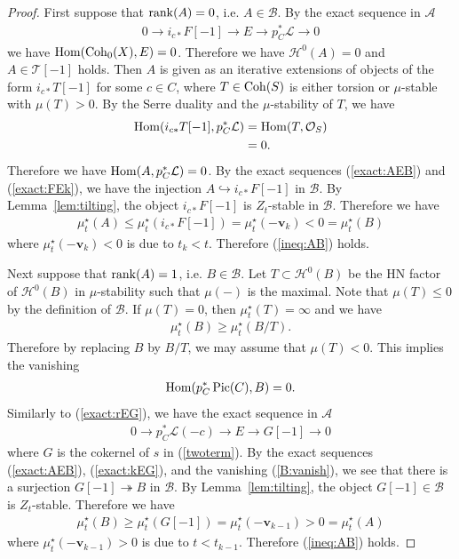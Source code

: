 \documentclass[11pt]{amsart}
\theoremstyle{plain}
\newcommand{\aA}{\mathcal{A}}
\newcommand{\bB}{\mathcal{B}}
\newcommand{\hH}{\mathcal{H}}
\newcommand{\lL}{\mathcal{L}}
\newcommand{\oO}{\mathcal{O}}
\newcommand{\tT}{\mathcal{T}}
\newcommand{\Hom}{\mathop{\rm Hom}\nolimits}
\newcommand{\Pic}{\mathop{\rm Pic}\nolimits}
\newcommand{\rank}{\mathop{\rm rank}\nolimits}
\newcommand{\Coh}{\mathop{\rm Coh}\nolimits}
\begin{document}
\begin{proof}
First suppose that 
$\rank(A)=0$, i.e. $A \in \bB$. 
By the exact sequence in $\aA$
\begin{align}\label{exact:FEk}
0 \to i_{c\ast}F[-1] \to E \to p_C^{\ast}\lL \to 0
\end{align}
we have
$\Hom(\Coh_0(X), E)=0$. 
Therefore we have $\hH^0(A)=0$
and $A \in \tT[-1]$ holds. 
Then $A$ is given as an iterative extensions
of objects of the form $i_{c\ast}T[-1]$ 
for some $c \in C$, 
where $T \in \Coh(S)$ is either torsion or 
$\mu$-stable with $\mu(T)>0$. 
By the Serre duality and the $\mu$-stability of $T$, we have 
\begin{align*}
\Hom(i_{c\ast}T[-1], p^{\ast}_C\lL) &=
\Hom(T, \oO_{S}) \\
&=0. 
\end{align*}
Therefore we have $\Hom(A, p^{\ast}_C\lL)=0$. 
By the exact sequences (\ref{exact:AEB}) and (\ref{exact:FEk}), 
we have the injection 
$A \hookrightarrow i_{c\ast}F[-1]$ in $\bB$. By Lemma~\ref{lem:tilting}, 
the object $i_{c\ast}F[-1]$ is $Z_t$-stable
in $\bB$. Therefore we have
\begin{align*}
\mu_t^{\star}(A) \le \mu_t^{\star}(i_{c\ast}F[-1])
=\mu_t^{\star}(-\mathbf{v}_k)<0=\mu_t^{\star}(B)
\end{align*}
where $\mu_t^{\star}(-\mathbf{v}_k)<0$ is due to $t_k<t$. 
Therefore (\ref{ineq:AB}) holds. 

Next suppose that $\rank(A)=1$, i.e. $B \in \bB$. 
Let $T \subset \hH^0(B)$ be
the HN factor of $\hH^0(B)$ in $\mu$-stability 
such that
$\mu(-)$ is the maximal. 
Note that $\mu(T) \le 0$ 
by the definition of $\bB$. 
If $\mu(T)=0$, then 
$\mu_t^{\star}(T)=\infty$ and we have 
\begin{align*}
\mu_t^{\star}(B) \ge \mu_t^{\star}(B/T).
\end{align*}
Therefore by replacing $B$ by $B/T$, we may assume that 
$\mu(T)<0$. 
This implies the vanishing 
\begin{align}\label{B:vanish}
\Hom(p_C^{\ast}\Pic(C), B)=0.
\end{align}
Similarly to (\ref{exact:rEG}), we have the 
exact sequence in $\aA$
\begin{align}\label{exact:kEG}
0 \to p_C^{\ast}\lL(-c) \to E \to G[-1] \to 0
\end{align}
where $G$ is the cokernel of $s$ in (\ref{twoterm}). 
By the exact sequences (\ref{exact:AEB}), (\ref{exact:kEG}),
and the vanishing (\ref{B:vanish}), 
we see that there is a 
surjection $G[-1] \twoheadrightarrow B$
in $\bB$. By Lemma~\ref{lem:tilting}, 
the object $G[-1] \in \bB$ is $Z_t$-stable.
Therefore we have
\begin{align*}
\mu_t^{\star}(B) \ge \mu_t^{\star}(G[-1])
=\mu_t^{\star}(-\mathbf{v}_{k-1})>0=\mu_t^{\star}(A)
\end{align*} 
where $\mu_t^{\star}(-\mathbf{v}_{k-1})>0$ is due to $t<t_{k-1}$.
Therefore (\ref{ineq:AB}) holds. 
\end{proof}
\end{document}
